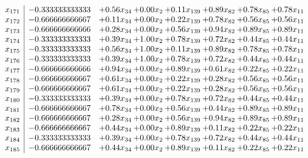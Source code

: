 \documentclass[8pt]{article}
\begin{document}
\[\begin{array}{c| c c@{\hskip 2pt} c@{\hskip 2pt} c@{\hskip 2pt} c@{\hskip 2pt} c@{\hskip 2pt} c@{\hskip 2pt} }
 x_{171}   &  -0.333333333333 & +  0.56 x_{34} & +  0.00 x_{2} & +  0.11 x_{139} & +  0.89 x_{82} & +  0.78 x_{85} & +  0.78 x_{11}\\
 x_{172}   &  -0.666666666667 & +  0.11 x_{34} & +  0.00 x_{2} & +  0.22 x_{139} & +  0.78 x_{82} & +  0.56 x_{85} & +  0.56 x_{11}\\
 x_{173}   &  -0.666666666666 & +  0.28 x_{34} & +  0.00 x_{2} & +  0.56 x_{139} & +  0.94 x_{82} & +  0.89 x_{85} & +  0.89 x_{11}\\
 x_{174}   &  -0.333333333333 & +  0.39 x_{34} & +  1.00 x_{2} & +  0.78 x_{139} & +  0.72 x_{82} & +  0.44 x_{85} & +  0.44 x_{11}\\
 x_{175}   &  -0.333333333333 & +  0.56 x_{34} & +  1.00 x_{2} & +  0.11 x_{139} & +  0.89 x_{82} & +  0.78 x_{85} & +  0.78 x_{11}\\
 x_{176}   &  -0.333333333333 & +  0.39 x_{34} & +  1.00 x_{2} & +  0.78 x_{139} & +  0.72 x_{82} & +  0.44 x_{85} & +  0.44 x_{11}\\
 x_{177}   &  -0.666666666666 & +  0.94 x_{34} & +  0.00 x_{2} & +  0.89 x_{139} & +  0.61 x_{82} & +  0.22 x_{85} & +  0.22 x_{11}\\
 x_{178}   &  -0.666666666667 & +  0.61 x_{34} & +  0.00 x_{2} & +  0.22 x_{139} & +  0.28 x_{82} & +  0.56 x_{85} & +  0.56 x_{11}\\
 x_{179}   &  -0.666666666667 & +  0.61 x_{34} & +  0.00 x_{2} & +  0.22 x_{139} & +  0.28 x_{82} & +  0.56 x_{85} & +  0.56 x_{11}\\
 x_{180}   &  -0.333333333333 & +  0.39 x_{34} & +  0.00 x_{2} & +  0.78 x_{139} & +  0.72 x_{82} & +  0.44 x_{85} & +  0.44 x_{11}\\
 x_{181}   &  -0.666666666667 & +  0.78 x_{34} & +  0.00 x_{2} & +  0.56 x_{139} & +  0.44 x_{82} & +  0.89 x_{85} & +  0.89 x_{11}\\
 x_{182}   &  -0.666666666667 & +  0.28 x_{34} & +  0.00 x_{2} & +  0.56 x_{139} & +  0.94 x_{82} & +  0.89 x_{85} & +  0.89 x_{11}\\
 x_{183}   &  -0.666666666667 & +  0.44 x_{34} & +  0.00 x_{2} & +  0.89 x_{139} & +  0.11 x_{82} & +  0.22 x_{85} & +  0.22 x_{11}\\
 x_{184}   &  -0.333333333333 & +  0.39 x_{34} & +  0.00 x_{2} & +  0.78 x_{139} & +  0.72 x_{82} & +  0.44 x_{85} & +  0.44 x_{11}\\
 x_{185}   &  -0.666666666667 & +  0.44 x_{34} & +  0.00 x_{2} & +  0.89 x_{139} & +  0.11 x_{82} & +  0.22 x_{85} & +  0.22 x_{11}\\

\end{array}\]
\end{document}
